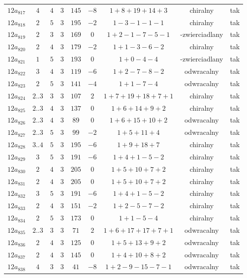 \begin{longtable}{ccccccccc}
$12a_{817}$ & $4$ & $4$ & $3$ & $145$ & $-8$ & $1+8+19+14+3$ & chiralny & tak \\
$12a_{818}$ & $2$ & $5$ & $3$ & $195$ & $-2$ & $1-3-1-1-1$ & chiralny & tak \\
$12a_{819}$ & $2$ & $3$ & $3$ & $169$ & $0$ & $1+2-1-7-5-1$ & -zwierciadlany & tak \\
$12a_{820}$ & $2$ & $4$ & $3$ & $179$ & $-2$ & $1+1-3-6-2$ & chiralny & tak \\
$12a_{821}$ & $1$ & $5$ & $3$ & $193$ & $0$ & $1+0-4-4$ & -zwierciadlany & tak \\
$12a_{822}$ & $3$ & $4$ & $3$ & $119$ & $-6$ & $1+2-7-8-2$ & odwracalny & tak \\
$12a_{823}$ & $2$ & $5$ & $3$ & $141$ & $-4$ & $1+1-7-4$ & odwracalny & tak \\
$12a_{824}$ & $2..3$ & $3$ & $3$ & $107$ & $2$ & $1+7+19+18+7+1$ & chiralny & tak \\
$12a_{825}$ & $2..3$ & $4$ & $3$ & $137$ & $0$ & $1+6+14+9+2$ & chiralny & tak \\
$12a_{826}$ & $2..3$ & $4$ & $3$ & $89$ & $0$ & $1+6+15+10+2$ & odwracalny & tak \\
$12a_{827}$ & $2..3$ & $5$ & $3$ & $99$ & $-2$ & $1+5+11+4$ & odwracalny & tak \\
$12a_{828}$ & $3..4$ & $5$ & $3$ & $195$ & $-6$ & $1+9+18+7$ & chiralny & tak \\
$12a_{829}$ & $3$ & $5$ & $3$ & $191$ & $-6$ & $1+4+1-5-2$ & chiralny & tak \\
$12a_{830}$ & $2$ & $4$ & $3$ & $205$ & $0$ & $1+5+10+7+2$ & chiralny & tak \\
$12a_{831}$ & $2$ & $4$ & $3$ & $205$ & $0$ & $1+5+10+7+2$ & chiralny & tak \\
$12a_{832}$ & $3$ & $5$ & $3$ & $191$ & $-6$ & $1+4+1-5-2$ & chiralny & tak \\
$12a_{833}$ & $2$ & $4$ & $3$ & $151$ & $-2$ & $1+2-5-7-2$ & chiralny & tak \\
$12a_{834}$ & $2$ & $5$ & $3$ & $173$ & $0$ & $1+1-5-4$ & chiralny & tak \\
$12a_{835}$ & $2..3$ & $3$ & $3$ & $71$ & $2$ & $1+6+17+17+7+1$ & odwracalny & tak \\
$12a_{836}$ & $2$ & $4$ & $3$ & $125$ & $0$ & $1+5+13+9+2$ & odwracalny & tak \\
$12a_{837}$ & $2$ & $4$ & $3$ & $145$ & $0$ & $1+4+10+8+2$ & odwracalny & tak \\
$12a_{838}$ & $4$ & $3$ & $3$ & $41$ & $-8$ & $1+2-9-15-7-1$ & odwracalny & tak \\

\end{longtable}
